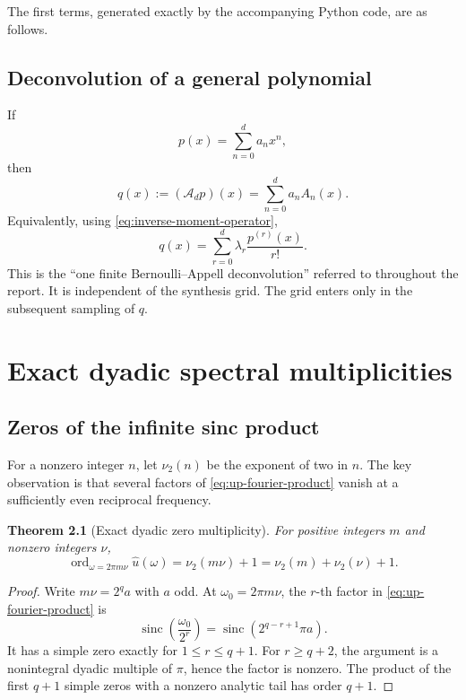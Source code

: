\documentclass[11pt,oneside]{book}
\newtheorem{theorem}{Theorem}[chapter]
\theoremstyle{definition}
\theoremstyle{remark}
\DeclareMathOperator{\ord}{ord}
\newcommand{\Aop}{\mathcal A}
\newcommand{\vtwo}{\nu_2}
\begin{document}
The first terms, generated exactly by the accompanying Python code, are as follows.

\section{Deconvolution of a general polynomial}
If
\[
 p(x)=\sum_{n=0}^{d}a_nx^n,
\]
then
\begin{equation}
 q(x):=(\Aop_dp)(x)=\sum_{n=0}^{d}a_nA_n(x).
 \label{eq:q-appell-linear-combination}
\end{equation}
Equivalently, using \cref{eq:inverse-moment-operator},
\begin{equation}
 q(x)=\sum_{r=0}^{d}\lambda_r\frac{p^{(r)}(x)}{r!}.
 \label{eq:q-derivative-form}
\end{equation}
This is the ``one finite Bernoulli--Appell deconvolution'' referred to throughout the report.  It is independent of the synthesis grid.  The grid enters only in the subsequent sampling of \(q\).

\chapter{Exact dyadic spectral multiplicities}
\label{ch:spectral}

\section{Zeros of the infinite sinc product}
For a nonzero integer \(n\), let \(\vtwo(n)\) be the exponent of two in \(n\).  The key observation is that several factors of \cref{eq:up-fourier-product} vanish at a sufficiently even reciprocal frequency.

\begin{theorem}[Exact dyadic zero multiplicity]
\label{thm:zero-multiplicity}
For positive integers \(m\) and nonzero integers \(\nu\),
\begin{equation}
 \ord_{\omega=2\pi m\nu}\widehat u(\omega)
 =\vtwo(m\nu)+1
 =\vtwo(m)+\vtwo(\nu)+1.
 \label{eq:zero-multiplicity}
\end{equation}
\end{theorem}

\begin{proof}
Write \(m\nu=2^q a\) with \(a\) odd.  At \(\omega_0=2\pi m\nu\), the \(r\)-th factor in \cref{eq:up-fourier-product} is
\[
 \operatorname{sinc}\!\left(\frac{\omega_0}{2^r}\right)
 =\operatorname{sinc}\!\left(2^{q-r+1}\pi a\right).
\]
It has a simple zero exactly for \(1\le r\le q+1\).  For \(r\ge q+2\), the argument is a nonintegral dyadic multiple of \(\pi\), hence the factor is nonzero.  The product of the first \(q+1\) simple zeros with a nonzero analytic tail has order \(q+1\).
\end{proof}
\end{document}
